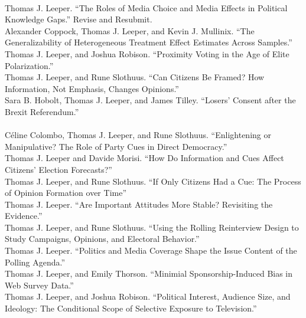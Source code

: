 \documentclass[12pt]{article}
\renewcommand{\section}[1]{\pagebreak[3]%
    \llap{\scshape\smash{\parbox[t]{\marginparwidth}{\raggedright {\color{lg}#1}}}}%
    \vspace{-\baselineskip}\par}
\newcommand{\topic}[1]{\pagebreak[3]\indent {\color{lg}{\footnotesize #1 }}\\}
\newcommand{\entry}[1]{\indent {\color{lg}\guillemotright}\hspace{2pt}#1\vspace{.25em}\\}
\begin{document}
{\section{Working Papers\\ \& Ongoing Projects}
\topic{Papers Under Review}
	\entry{Thomas J. Leeper. ``The Roles of Media Choice and Media Effects in Political Knowledge Gaps.'' Revise and Resubmit.}
	\entry{Alexander Coppock, Thomas J. Leeper, and Kevin J. Mullinix. ``The Generalizability of Heterogeneous Treatment Effect Estimates Across Samples.''}
	\entry{Thomas J. Leeper, and Joshua Robison. ``Proximity Voting in the Age of Elite Polarization.''}
	\entry{Thomas J. Leeper, and Rune Slothuus. ``Can Citizens Be Framed? How Information, Not Emphasis, Changes Opinions.''}
    \entry{Sara B. Hobolt, Thomas J. Leeper, and James Tilley. ``Losers' Consent after the Brexit Referendum.''}

\topic{Working Papers}
	\entry{C\'{e}line Colombo, Thomas J. Leeper, and Rune Slothuus. ``Enlightening or Manipulative? The Role of Party Cues in Direct Democracy.''}
	\entry{Thomas J. Leeper and Davide Morisi. ``How Do Information and Cues Affect Citizens' Election Forecasts?''}
	\entry{Thomas J. Leeper, and Rune Slothuus. ``If Only Citizens Had a Cue: The Process of Opinion Formation over Time''}
	\entry{Thomas J. Leeper. ``Are Important Attitudes More Stable? Revisiting the Evidence.''}
    \entry{Thomas J. Leeper, and Rune Slothuus. ``Using the Rolling Reinterview Design to Study Campaigns, Opinions, and Electoral Behavior.''}
	\entry{Thomas J. Leeper. ``Politics and Media Coverage Shape the Issue Content of the Polling Agenda.''}
	\entry{Thomas J. Leeper, and Emily Thorson. ``Minimial Sponsorship-Induced Bias in Web Survey Data.''}
	\entry{Thomas J. Leeper, and Joshua Robison. ``Political Interest, Audience Size, and Ideology: The Conditional Scope of Selective Exposure to Television.''}

}
\end{document}
